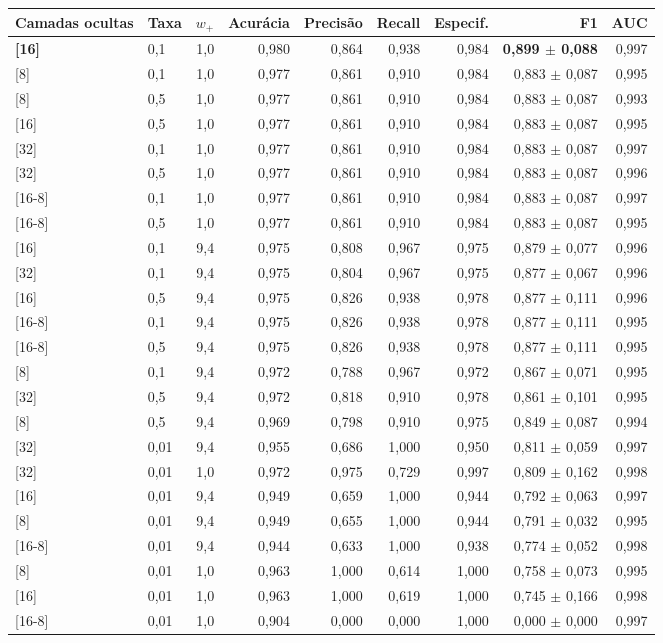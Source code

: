 \begin{tabular}{llrrrrrrr}
\toprule
Camadas ocultas & Taxa & $w_+$ & Acurácia & Precisão & Recall & Especif. & F1 & AUC \\
\midrule
\textbf{{[16]}} & 0,1 & 1,0 & 0,980 & 0,864 & 0,938 & 0,984 & \textbf{0,899 $\pm$ 0,088} & 0,997 \\
{[8]} & 0,1 & 1,0 & 0,977 & 0,861 & 0,910 & 0,984 & 0,883 $\pm$ 0,087 & 0,995 \\
{[8]} & 0,5 & 1,0 & 0,977 & 0,861 & 0,910 & 0,984 & 0,883 $\pm$ 0,087 & 0,993 \\
{[16]} & 0,5 & 1,0 & 0,977 & 0,861 & 0,910 & 0,984 & 0,883 $\pm$ 0,087 & 0,995 \\
{[32]} & 0,1 & 1,0 & 0,977 & 0,861 & 0,910 & 0,984 & 0,883 $\pm$ 0,087 & 0,997 \\
{[32]} & 0,5 & 1,0 & 0,977 & 0,861 & 0,910 & 0,984 & 0,883 $\pm$ 0,087 & 0,996 \\
{[16-8]} & 0,1 & 1,0 & 0,977 & 0,861 & 0,910 & 0,984 & 0,883 $\pm$ 0,087 & 0,997 \\
{[16-8]} & 0,5 & 1,0 & 0,977 & 0,861 & 0,910 & 0,984 & 0,883 $\pm$ 0,087 & 0,995 \\
{[16]} & 0,1 & 9,4 & 0,975 & 0,808 & 0,967 & 0,975 & 0,879 $\pm$ 0,077 & 0,996 \\
{[32]} & 0,1 & 9,4 & 0,975 & 0,804 & 0,967 & 0,975 & 0,877 $\pm$ 0,067 & 0,996 \\
{[16]} & 0,5 & 9,4 & 0,975 & 0,826 & 0,938 & 0,978 & 0,877 $\pm$ 0,111 & 0,996 \\
{[16-8]} & 0,1 & 9,4 & 0,975 & 0,826 & 0,938 & 0,978 & 0,877 $\pm$ 0,111 & 0,995 \\
{[16-8]} & 0,5 & 9,4 & 0,975 & 0,826 & 0,938 & 0,978 & 0,877 $\pm$ 0,111 & 0,995 \\
{[8]} & 0,1 & 9,4 & 0,972 & 0,788 & 0,967 & 0,972 & 0,867 $\pm$ 0,071 & 0,995 \\
{[32]} & 0,5 & 9,4 & 0,972 & 0,818 & 0,910 & 0,978 & 0,861 $\pm$ 0,101 & 0,995 \\
{[8]} & 0,5 & 9,4 & 0,969 & 0,798 & 0,910 & 0,975 & 0,849 $\pm$ 0,087 & 0,994 \\
{[32]} & 0,01 & 9,4 & 0,955 & 0,686 & 1,000 & 0,950 & 0,811 $\pm$ 0,059 & 0,997 \\
{[32]} & 0,01 & 1,0 & 0,972 & 0,975 & 0,729 & 0,997 & 0,809 $\pm$ 0,162 & 0,998 \\
{[16]} & 0,01 & 9,4 & 0,949 & 0,659 & 1,000 & 0,944 & 0,792 $\pm$ 0,063 & 0,997 \\
{[8]} & 0,01 & 9,4 & 0,949 & 0,655 & 1,000 & 0,944 & 0,791 $\pm$ 0,032 & 0,995 \\
{[16-8]} & 0,01 & 9,4 & 0,944 & 0,633 & 1,000 & 0,938 & 0,774 $\pm$ 0,052 & 0,998 \\
{[8]} & 0,01 & 1,0 & 0,963 & 1,000 & 0,614 & 1,000 & 0,758 $\pm$ 0,073 & 0,995 \\
{[16]} & 0,01 & 1,0 & 0,963 & 1,000 & 0,619 & 1,000 & 0,745 $\pm$ 0,166 & 0,998 \\
{[16-8]} & 0,01 & 1,0 & 0,904 & 0,000 & 0,000 & 1,000 & 0,000 $\pm$ 0,000 & 0,997 \\
\bottomrule
\end{tabular}
